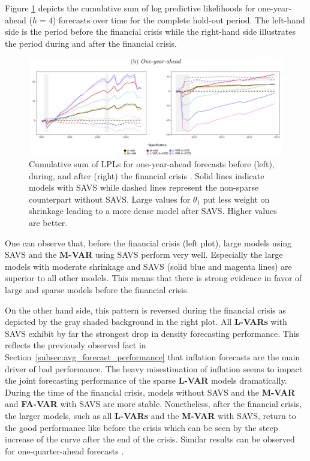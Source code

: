 Figure \ref{fig:lpl_one_year_ahead} depicts the cumulative sum of log predictive likelihoods for one-year-ahead ($h = 4$) forecasts over time for the complete hold-out period. The left-hand side is the period before the financial crisis while the right-hand side illustrates the period during and after the financial crisis.
\begin{figure}
    \centering
    \includegraphics[width=\textwidth]{figures/lpl_one_year_ahead.png}
    \caption{Cumulative sum of LPLs for one-year-ahead forecasts before (left), during, and after (right) the financial crisis \parencite[Figure~2]{hauzenberger_combining_2021}. Solid lines indicate models with SAVS while dashed lines represent the non-sparse counterpart without SAVS. Large values for $\theta_1$ put less weight on shrinkage leading to a more dense model after SAVS. Higher values are better.}
    \label{fig:lpl_one_year_ahead}
\end{figure}
One can observe that, before the financial crisis (left plot), large models using SAVS and the \textbf{M-VAR} using SAVS perform very well. Especially the large models with moderate shrinkage and SAVS (solid blue and magenta lines) are superior to all other models. This means that there is strong evidence in favor of large and sparse models before the financial crisis. 

On the other hand side, this pattern is reversed during the financial crisis as depicted by the gray shaded background in the right plot. All \textbf{L-VARs} with SAVS exhibit by far the strongest drop in density forecasting performance. This reflects the previously observed fact in Section~\ref{subsec:avg_forecast_performance} that inflation forecasts are the main driver of bad performance. The heavy misestimation of inflation seems to impact the joint forecasting performance of the sparse \textbf{L-VAR} models dramatically. During the time of the financial crisis, models without SAVS and the \textbf{M-VAR} and \textbf{FA-VAR} with SAVS are more stable. Nonetheless, after the financial crisis, the larger models, such as all \textbf{L-VARs} and the \textbf{M-VAR} with SAVS, return to the good performance like before the crisis which can be seen by the steep increase of the curve after the end of the crisis. Similar results can be observed for one-quarter-ahead forecasts \parencite[Figure~2]{hauzenberger_combining_2021}.

